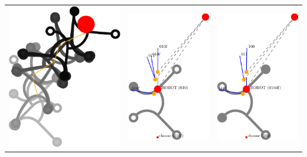 \documentclass[10pt,a4paper]{article}
\begin{document}
\begin{tabular}{ccc}
\includegraphics[scale=.8]{pics/pathplanner_without_noise/example_curve/gait.pdf}
&
\includegraphics[scale=.8]{pics/pathplanner_without_noise/example_curve/dec_0.pdf}
&
\includegraphics[scale=.8]{pics/pathplanner_without_noise/example_curve/dec_2.pdf}

\end{tabular}
\end{document}
